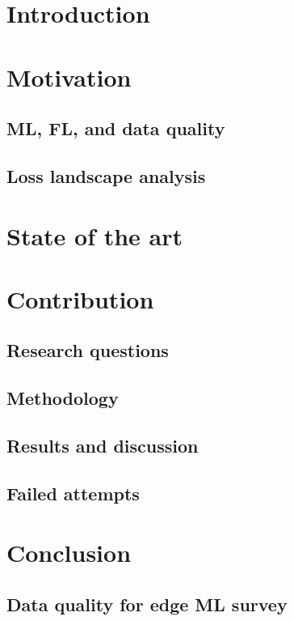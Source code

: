 \documentclass[12pt]{report}
\begin{document}
\setlength{\parskip}{1em}
\renewcommand{\baselinestretch}{2.0}

\newpage
{}
\setcounter{page}{1}

\chapter*{Introduction}
\chapter{Motivation}
\section{ML, FL, and data quality}
\section{Loss landscape analysis}
\chapter{State of the art}
\chapter{Contribution}
\section{Research questions}
\section{Methodology}
\section{Results and discussion}
\section{Failed attempts}
\chapter*{Conclusion}
\begin{appendices}
	\chapter{Data quality for edge ML survey}\label{app:survey}
	
\end{appendices}
\end{document}
